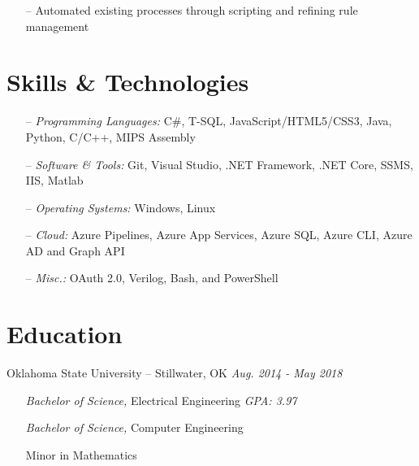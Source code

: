 \documentclass[line,overlapped,9pt]{res}
\begin{document}
\begin{resume}
\begin{itemize}
                  \item[--] Automated existing processes through scripting and refining rule management
                  \end{itemize}
%

     \section{Skills \& Technologies}

            \begin{itemize} 

            \setlength\itemsep{.1em}
            \item[--] {\sl Programming Languages:} C\#, T-SQL, JavaScript/HTML5/CSS3, Java, Python, C/C++, MIPS Assembly 
            \item[--] {\sl Software \& Tools:} Git, Visual Studio, .NET Framework, .NET Core,
              SSMS, IIS, Matlab 
            \item[--] {\sl Operating Systems:} Windows, Linux
            \item[--] {\sl Cloud:} Azure Pipelines, Azure App Services, Azure SQL,
              Azure CLI, Azure AD and Graph API
            \item[--] {\sl Misc.:} OAuth 2.0, Verilog, Bash, and PowerShell 
            \end{itemize} 

      \section{Education} Oklahoma State University -- Stillwater, OK \hfill {\sl Aug. 2014 - May 2018}
          \begin{itemize}
            \setlength\itemsep{.1em}
            \item[]{\sl Bachelor of Science,} Electrical Engineering \hfill {\sl GPA: 3.97}
            \item[]{\sl Bachelor of Science,} Computer Engineering 
            \item[] Minor in Mathematics 
          \end{itemize}
                

\end{resume}
\end{document}
